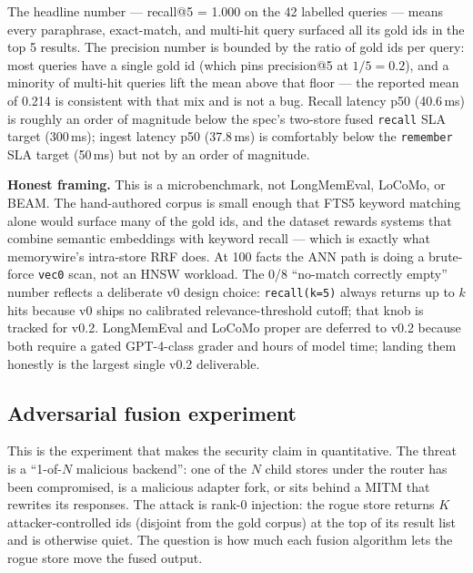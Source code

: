 \documentclass[11pt,letterpaper,twocolumn]{article}
\begin{document}
The headline number --- recall@5 = 1.000 on the 42 labelled queries --- means every paraphrase, exact-match, and multi-hit query surfaced all its gold ids in the top 5 results. The precision number is bounded by the ratio of gold ids per query: most queries have a single gold id (which pins precision@5 at $1/5 = 0.2$), and a minority of multi-hit queries lift the mean above that floor --- the reported mean of 0.214 is consistent with that mix and is not a bug. Recall latency p50 (40.6\,ms) is roughly an order of magnitude below the spec's two-store fused \texttt{recall} SLA target (300\,ms); ingest latency p50 (37.8\,ms) is comfortably below the \texttt{remember} SLA target (50\,ms) but not by an order of magnitude.

\textbf{Honest framing.} This is a microbenchmark, not LongMemEval, LoCoMo, or BEAM. The hand-authored corpus is small enough that FTS5 keyword matching alone would surface many of the gold ids, and the dataset rewards systems that combine semantic embeddings with keyword recall --- which is exactly what memorywire's intra-store RRF does. At 100 facts the ANN path is doing a brute-force \texttt{vec0} scan, not an HNSW workload. The 0/8 ``no-match correctly empty'' number reflects a deliberate v0 design choice: \texttt{recall(k=5)} always returns up to $k$ hits because v0 ships no calibrated relevance-threshold cutoff; that knob is tracked for v0.2. LongMemEval and LoCoMo proper are deferred to v0.2 because both require a gated GPT-4-class grader and hours of model time; landing them honestly is the largest single v0.2 deliverable.

\subsection{Adversarial fusion experiment}
\label{sec:eval-adversarial}

This is the experiment that makes the security claim in  quantitative. The threat is a ``1-of-$N$ malicious backend'': one of the $N$ child stores under the router has been compromised, is a malicious adapter fork, or sits behind a MITM that rewrites its responses. The attack is rank-0 injection: the rogue store returns $K$ attacker-controlled ids (disjoint from the gold corpus) at the top of its result list and is otherwise quiet. The question is how much each fusion algorithm lets the rogue store move the fused output.
\end{document}

